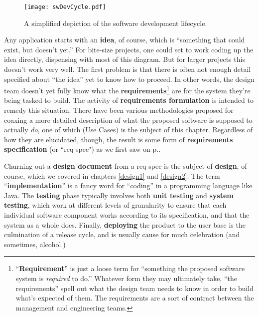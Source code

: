 \begin{figure}
\centering
\texttt{[image: swDevCycle.pdf]}
\caption{A simplified depiction of the software development lifecycle.}
\label{fig:swDevCycle}
\end{figure}

Any application starts with an \textbf{idea}, of course, which is ``something
that could exist, but doesn't yet.'' For bite-size projects, one could set to
work coding up the idea directly, dispensing with most of this diagram. But
for larger projects this doesn't work very well. The first problem is that
there is often not enough detail specified about ``the idea'' yet to know how
to proceed. In other words, the design team doesn't yet fully know what the
\textbf{requirements}\footnote{``\textbf{Requirement}'' is just a loose term
for ``something the proposed software system is \textit{required} to do.''
Whatever form they may ultimately take, ``the requirements'' spell out what
the design team needs to know in order to build what's expected of them. The
requirements are a sort of contract between the management and engineering
teams.} are for the system they're being tasked to build. The activity of
\textbf{requirements formulation} is intended to remedy this situation. There
have been various methodologies proposed for coaxing a more detailed
description of what the proposed software is supposed to actually \textit{do},
one of which (Use Cases) is the subject of this chapter. Regardless of how
they are elucidated, though, the result is some form of \textbf{requirements
specification} (or ``req spec") as we first saw on p.\pageref{reqSpec}.

Churning out a \textbf{design document} from a req spec is the subject of
\textbf{design}, of course, which we covered in chapters \ref{design1} and
\ref{design2}. The term ``\textbf{implementation}'' is a fancy word for
``coding'' in a programming language like Java. The \textbf{testing} phase
typically involves both \textbf{unit testing} and \textbf{system testing},
which work at different levels of granularity to ensure that each individual
software component works according to its specification, and that the system
as a whole does. Finally, \textbf{deploying} the product to the user base is
the culmination of a release cycle, and is usually cause for much celebration
(and sometimes, alcohol.)

